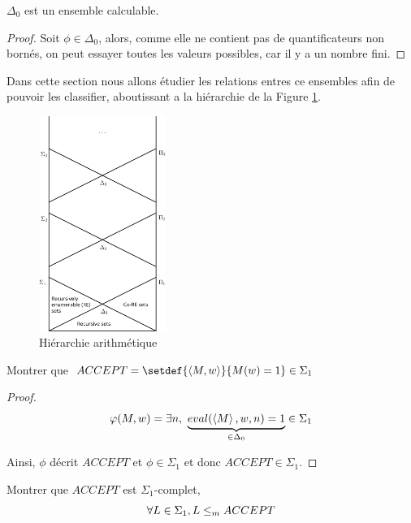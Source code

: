 \begin{prop}
	$\Delta_0$ est un ensemble calculable.
\end{prop}

\begin{proof}
	Soit $\phi \in \Delta_0$, alors, comme elle ne contient pas de quantificateurs non bornés, on peut essayer toutes les valeurs possibles, car il y a un nombre
	fini.
\end{proof}


Dans cette section nous allons étudier les relations entres ce ensembles afin de pouvoir les classifier, aboutissant a la hiérarchie de la Figure \ref{fig:arith-hier}.


\begin{figure}[h]
	\begin{center}
		\includegraphics[height=7cm]{./images/Arithmetic_hierarchy.png}
	\end{center}
	\caption{Hiérarchie arithmétique}
	\label{fig:arith-hier}
\end{figure}


\begin{exercice}
	Montrer que $ACCEPT = \setdef {\encode {M,w}} {M(w) = 1} \in \Sigma_1$
\end{exercice}

\begin{proof}
	$$\varphi (M,w) =  \exists n, \ \underbrace{eval(\left\langle M\right\rangle, w, n) = 1}_{\in \Delta_0} \in \Sigma_1$$

	Ainsi, $\phi$ décrit $ACCEPT$ et $\phi \in \Sigma_1$ et donc $ACCEPT \in \Sigma_1$.
\end{proof}


\begin{exercice}
	Montrer que $ACCEPT$ est $\Sigma_1$-complet, \ie
	$$ \forall L \in \Sigma_1, L \leq_m ACCEPT $$
\end{exercice}

